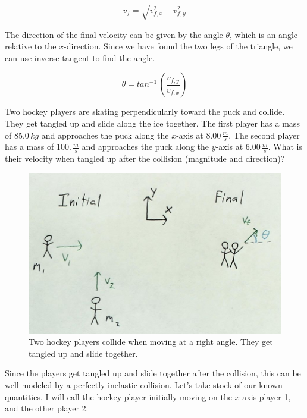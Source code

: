 \documentclass[12pt]{book}
\begin{document}
\begin{equation}
v_f = \sqrt{v_{f,x}^2 + v_{f,y}^2}
\end{equation}

The direction of the final velocity can be given by the angle $\theta$, which is an angle relative to the $x$-direction. Since we have found the two legs of the triangle, we can use inverse tangent to find the angle.

\begin{equation}
\theta = tan^{-1} \, \left( \frac{v_{f,y}}{v_{f,x}} \right)
\end{equation}

\begin{exampleblock}

Two hockey players are skating perpendicularly toward the puck and collide. They get tangled up and slide along the ice together. The first player has a mass of $85.0 \, kg$ and approaches the puck along the $x$-axis at $8.00 \, \frac{m}{s}$. The second player has a mass of $100. \, \frac{m}{s}$ and approaches the puck along the $y$-axis at $6.00 \, \frac{m}{s}$. What is their velocity when tangled up after the collision (magnitude and direction)?

\begin{figure}[H]
\centering
\includegraphics[scale=0.8]{hockey_collision.png}
\caption{Two hockey players collide when moving at a right angle. They get tangled up and slide together.}
\label{hockeycollision}
\end{figure}

\hspace{10pt}

Since the players get tangled up and slide together after the collision, this can be well modeled by a perfectly inelastic collision. Let's take stock of our known quantities. I will call the hockey player initially moving on the $x$-axis player 1, and the other player 2.


\end{exampleblock}
\end{document}
